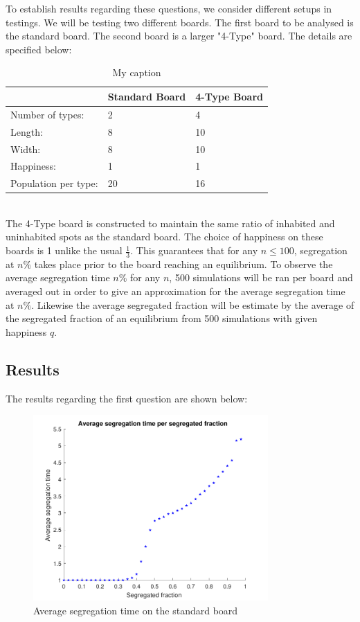 To establish results regarding these questions, we consider different setups in testings. We will be testing two different boards.
The first board to be analysed is the standard board. The second board is a larger 
"4-Type" board. The details are specified below:
\begin{table}[h!]
\centering
\caption{My caption}
\label{my-label}
\begin{tabular}{l|l|l}
  & Standard Board & 4-Type Board\\ \hline
Number of types:& 2 & 4 \\ 
 Length:& 8 & 10  \\
 Width:& 8 & 10  \\
 Happiness:& 1 & 1  \\
Population per type: & 20 & 16  
	\end{tabular}
	\end{table}
\\
The 4-Type board is constructed to maintain the same ratio of inhabited and uninhabited spots as the standard board. The choice of happiness on these boards is 1 unlike the usual \(\frac{1}{3}\). 
This guarantees that for any \(n\leq 100\), segregation at \(n\%\) takes place prior to the board reaching an equilibrium. 
To observe the average segregation time \(n\%\) for any \(n\), 500 simulations will be ran per board and averaged out in order to give an approximation for the average segregation time at \(n\%\).
Likewise the average segregated fraction will be estimate by the average of the segregated fraction of an equilibrium from 500 simulations with given happiness \(q\).
\newpage
\subsection{Results}
The results regarding the first question are shown below:\\

\begin{figure}[H]
    \centering
    \includegraphics[width=0.8\textwidth]{aveseg_sb_2}
    \caption{Average segregation time on the standard board}
    \label{fig:avesegsb}
\end{figure}


